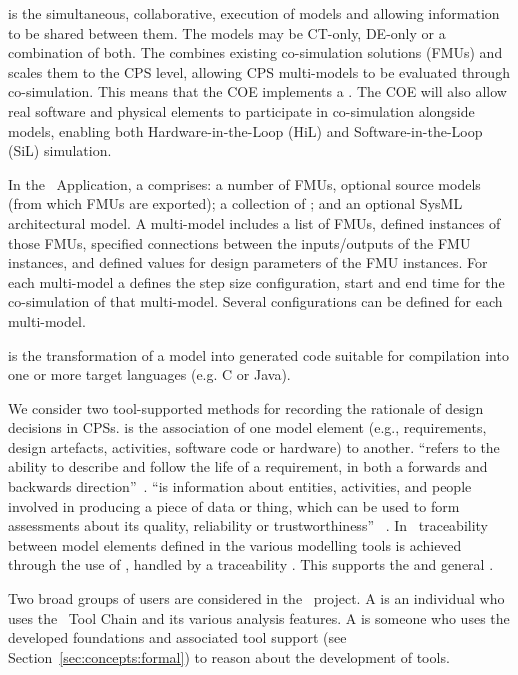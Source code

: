   is the simultaneous, collaborative, execution of models and allowing information to be shared between them. The models may be CT-only, DE-only or a combination of both. The  combines existing co-simulation solutions (FMUs) and scales them to the CPS level, allowing CPS multi-models to be evaluated through co-simulation. This means that the COE implements a . The COE will also allow real software and physical elements to participate in co-simulation alongside models, enabling both Hardware-in-the-Loop (HiL) and Software-in-the-Loop (SiL) simulation.

In the \into\ Application, a  comprises: a number of FMUs, optional source models (from which FMUs are exported); a collection of ; and an optional SysML architectural model. A multi-model includes a list of FMUs, defined instances of those FMUs, specified connections between the inputs/outputs of the FMU instances, and defined values for design parameters of the FMU instances. For each multi-model a  defines the step size configuration, start and end time for the co-simulation of that multi-model. Several configurations can be defined for each multi-model.

 is the transformation of a model into generated code suitable for compilation into one or more target languages (e.g. C or Java).

We consider two tool-supported methods for recording the rationale of design decisions in CPSs.   is the association of one model element (e.g., requirements, design artefacts, activities, software code or hardware) to another.  ``refers to the ability to describe and follow the life of a requirement, in both a forwards and backwards direction''~\cite{Gotel&94}.  ``is information about entities, activities, and people involved in producing a piece of data or thing, which can be used to form assessments about its quality, reliability or trustworthiness'' ~\cite{Moreau&13}. In \into\ traceability between model elements defined in the various modelling tools is achieved through the use of , handled by a traceability . This supports the  and general .

Two broad groups of users are considered in the \into\ project. A  is an individual who uses the \into\ Tool Chain and its various analysis features. A  is someone who uses the developed foundations and associated tool support (see Section~\ref{sec:concepts:formal}) to reason about the development of tools.

